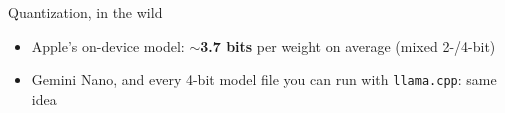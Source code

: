 \begin{frame}{Quantization, in the wild}
  \vspace{0.7em}
  \raggedright
  \begin{itemize}\itemsep7pt
    \item Apple's on-device model: $\sim$\textbf{3.7 bits} per weight on average
      (mixed 2-/4-bit)
    \item Gemini Nano, and every 4-bit model file you can run with
      \texttt{llama.cpp}: same idea
  \end{itemize}

  \vspace{0.9em}
\end{frame}

